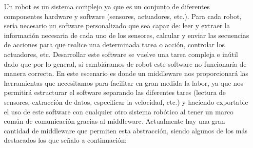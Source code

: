 Un robot es un sistema complejo ya que es un conjunto de diferentes componentes hardware y software (sensores, actuadores, etc.). Para cada robot, sería necesario un software personalizado que sea capaz de: leer y extraer la información necesaria de cada uno de los sensores, calcular y enviar las secuencias de acciones para que realice una determinada tarea o acción, controlar los actuadores, etc. Desarrollar este software se vuelve una tarea compleja e inútil dado que por lo general, si cambiáramos de robot este software no funcionaría de manera correcta.
En este escenario es donde un middleware nos proporcionará las herramientas que necesitamos para facilitar en gran medida la labor, ya que nos permitirá estructurar el software separando las diferentes tares (lectura de sensores, extracción de datos, especificar la velocidad, etc.) y haciendo exportable el uso de este software con cualquier otro sistema robótico al tener un marco común de comunicación gracias al middleware.
Actualmente hay una gran cantidad de middleware que permiten esta abstracción, siendo algunos de los más destacados los que señalo a continuación:
